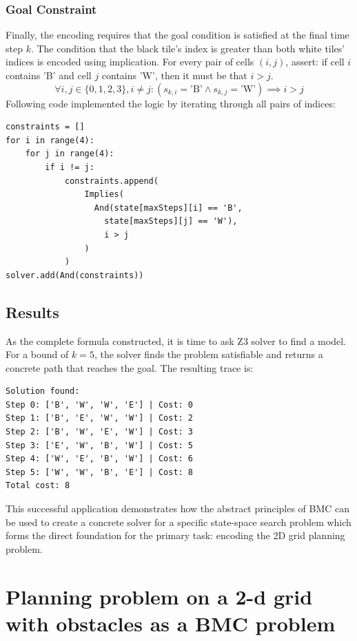\documentclass[12pt, a4paper, oneside]{report} %
\begin{document}
\subsubsection{Goal Constraint}
Finally, the encoding requires that the goal condition is satisfied at the final time step $k$. The condition that the black tile's index is greater than both white tiles' indices is encoded using implication. For every pair of cells $(i, j)$,  assert: if cell $i$ contains 'B' and cell $j$ contains 'W', then it must be that $i > j$.
$$ \forall i,j \in \{0,1,2,3\}, i \neq j : (s_{k,i} = \text{'B'} \land s_{k,j} = \text{'W'}) \implies i > j $$
Following code implemented the logic by iterating through all pairs of indices:
\begin{verbatim}
constraints = []
for i in range(4):
    for j in range(4):
        if i != j:
            constraints.append(
                Implies(
                  And(state[maxSteps][i] == 'B', 
                    state[maxSteps][j] == 'W'),
                    i > j
                )
            )
solver.add(And(constraints))
\end{verbatim}

\subsection{Results}
As the complete formula constructed, it is time to ask Z3 solver to find a model. For a bound of $k=5$, the solver finds the problem satisfiable and returns a concrete path that reaches the goal. The resulting trace is:
\begin{verbatim}
Solution found:
Step 0: ['B', 'W', 'W', 'E'] | Cost: 0
Step 1: ['B', 'E', 'W', 'W'] | Cost: 2
Step 2: ['B', 'W', 'E', 'W'] | Cost: 3
Step 3: ['E', 'W', 'B', 'W'] | Cost: 5
Step 4: ['W', 'E', 'B', 'W'] | Cost: 6
Step 5: ['W', 'W', 'B', 'E'] | Cost: 8
Total cost: 8
\end{verbatim}
This successful application demonstrates how the abstract principles of BMC can be used to create a concrete solver for a specific state-space search problem which forms the direct foundation for the primary task: encoding the 2D grid planning problem.
\section{Planning problem on a 2-d grid with obstacles as a BMC problem}
\end{document}
